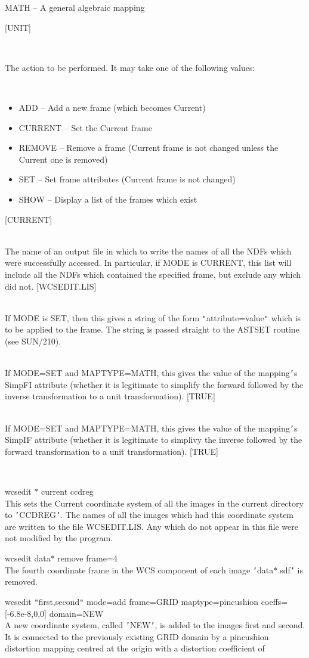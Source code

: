 \documentclass[twoside,11pt]{article}
\newcommand{\xref}[3]{#1}
\renewcommand{\_}{\texttt{\symbol{95}}}
\newcommand{\qt}[1]{{\tt "}#1{\tt "}}
\newcommand{\sstexamples}[1]{
   \item[Examples:] \mbox{} \\
   \vspace{-3.5ex}
   \begin{description}
      #1
   \end{description}
}
\newcommand{\sstsubsection}[1]{ \item[{#1}] \mbox{} \\}
\newcommand{\sstexamplesubsection}[2]{\sloppy \item{\ssttt #1} \mbox{} \\ #2 }
\newcommand{\sstitemlist}[1]{
  \mbox{} \\
  \vspace{-3.5ex}
  \begin{itemize}
     #1
  \end{itemize}
}
\newcommand{\sstitem}{\item}
\newcommand{\sstexamples}[1]{
      \item[Examples:] \\
      \begin{description}
         #1
      \end{description}
      \\
   }
\newcommand{\sstsubsection}[1]{\item[{#1}]}
\newcommand{\sstexamplesubsection}[2]{\item[{\ssttt #1}] #2}
\newcommand{\sstitemlist}[1]{
      \begin{itemize}
         #1
      \end{itemize}
      \\
   }
\newcommand{\sstitem}{\item}
\begin{document}
{{{{            \sstitem
               MATH       -- A general algebraic mapping
         }
         [UNIT]
      }
      \sstsubsection{
         MODE = LITERAL (Read)
      } {
         The action to be performed.  It may take one of the following
         values:
         \sstitemlist{
            \sstitem
               ADD      -- Add a new frame (which becomes Current)
            \sstitem
               CURRENT  -- Set the Current frame
            \sstitem
               REMOVE   -- Remove a frame (Current frame is not changed
                           unless the Current one is removed)
            \sstitem
               SET      -- Set frame attributes (Current frame is not
                           changed)
            \sstitem
               SHOW     -- Display a list of the frames which exist
         }
         [CURRENT]
      }
      \sstsubsection{
         NAMELIST = LITERAL (Read)
      } {
         The name of an output file in which to write the names of all
         the NDFs which were successfully accessed.  In particular, if
         MODE is CURRENT, this list will include all the NDFs which 
         contained the specified frame, but exclude any which did not.
         [WCSEDIT.LIS]
      }
      \sstsubsection{
         SET = LITERAL (Read)
      } {
         If MODE is SET, then this gives a string of the form
         \qt{attribute=value} which is to be applied to the frame.  The
         string is passed straight to the \xref{AST\_SET}{sun210}{AST\_SET} 
         routine (see \xref{SUN/210}{sun210}{}).
      }
      \sstsubsection{
         SIMPFI = \_LOGICAL (Read)
      }{
         If MODE=SET and MAPTYPE=MATH, this gives the value of the
         mapping{\tt '}s SimpFI attribute (whether it is legitimate to simplify
         the forward followed by the inverse transformation to a unit
         transformation).
         [TRUE]
      }
      \sstsubsection{
         SIMPIF = \_LOGICAL (Read)
      }{
         If MODE=SET and MAPTYPE=MATH, this gives the value of the
         mapping{\tt '}s SimpIF attribute (whether it is legitimate to simplivy
         the inverse followed by the forward transformation to a unit
         transformation).
         [TRUE]
      }
   }
   \sstexamples{
      \sstexamplesubsection{
         wcsedit $*$ current ccd\_reg
      }{
         This sets the Current coordinate system of all the images in
         the current directory to {\tt '}CCD\_REG{\tt '}.  The names of all the
         images which had this coordinate system are written to the 
         file WCSEDIT.LIS.  Any which do not appear in this file were
         not modified by the program.
      }
      \sstexamplesubsection{
         wcsedit data$*$ remove frame=4
      }{
         The fourth coordinate frame in the WCS component of each image
         {\tt '}data$*$.sdf{\tt '} is removed.
      }
      \sstexamplesubsection{
         wcsedit {\tt "}first,second{\tt "} mode=add frame=GRID maptype=pincushion
              coeffs=[-6.8e-8,0,0] domain=NEW
      }{
         A new coordinate system, called {\tt '}NEW{\tt '}, is added to the images
         first  and second.  It is connected to the previously
         existing GRID domain by a pincushion distortion mapping
         centred at the origin with a distortion coefficient of
         \sstitemlist{

}}}}
\end{document}

